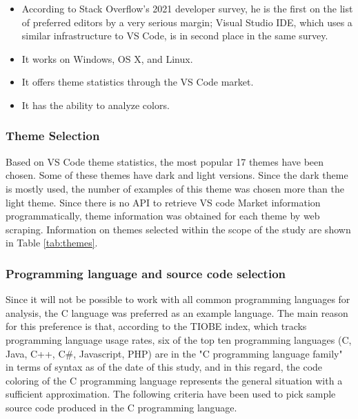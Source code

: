 \documentclass{article}
\begin{document}
\begin{itemize}
  \item According to Stack Overflow's 2021 developer survey\cite{so2022survey}, he is the first on the list of preferred editors by a very serious margin; Visual Studio IDE, which uses a similar infrastructure to VS Code, is in second place in the same survey.
  \item It works on Windows, OS X, and Linux.
  \item It offers theme statistics\cite{vs2022thememarket} through the VS Code market.
  \item It has the ability to analyze colors.
\end{itemize}

\subsubsection{Theme Selection} \label{sec:material-methods.inputs.themes}

Based on VS Code theme statistics\cite{vs2022thememarket}, the most popular 17 themes have been chosen. Some of these
themes have dark and light versions. Since the dark theme is mostly used\cite{sarath2016prefer}, the number of examples
of this theme was chosen more than the light theme. Since there is no API to retrieve VS code Market information
programmatically, theme information was obtained for each theme by web scraping. Information on themes selected within
the scope of the study are shown in Table \ref{tab:themes}. 

\subsubsection{Programming language and source code selection} \label{sec:material-methods.inputs.language}

Since it will not be possible to work with all common programming languages for analysis, the C language was preferred as an example language. The main reason for this preference is that, according to the TIOBE index, which tracks programming language usage rates, six of the top ten programming languages (C, Java, C++, C\#, Javascript, PHP) are in the "C programming language family" in terms of syntax as of the date of this study\cite{tiobe2022index}, and in this regard, the code coloring of the C programming language represents the general situation with a sufficient approximation. The following criteria have been used to pick sample source code produced in the C programming language.
\end{document}
